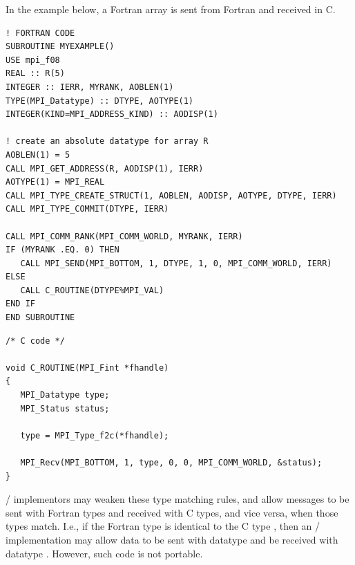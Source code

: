 \begin{example}
%
%
In the example below, a Fortran array is sent from Fortran and received in
C.

\begin{lstlisting}[language={[MPI08]Fortran}]
! FORTRAN CODE
SUBROUTINE MYEXAMPLE()
USE mpi_f08
REAL :: R(5)
INTEGER :: IERR, MYRANK, AOBLEN(1)
TYPE(MPI_Datatype) :: DTYPE, AOTYPE(1)
INTEGER(KIND=MPI_ADDRESS_KIND) :: AODISP(1)

! create an absolute datatype for array R
AOBLEN(1) = 5
CALL MPI_GET_ADDRESS(R, AODISP(1), IERR)
AOTYPE(1) = MPI_REAL
CALL MPI_TYPE_CREATE_STRUCT(1, AOBLEN, AODISP, AOTYPE, DTYPE, IERR)
CALL MPI_TYPE_COMMIT(DTYPE, IERR)

CALL MPI_COMM_RANK(MPI_COMM_WORLD, MYRANK, IERR)
IF (MYRANK .EQ. 0) THEN
   CALL MPI_SEND(MPI_BOTTOM, 1, DTYPE, 1, 0, MPI_COMM_WORLD, IERR)
ELSE
   CALL C_ROUTINE(DTYPE%MPI_VAL)
END IF
END SUBROUTINE
\end{lstlisting}

\begin{lstlisting}[language={[MPI]C}]
/* C code */

void C_ROUTINE(MPI_Fint *fhandle)
{
   MPI_Datatype type;
   MPI_Status status;

   type = MPI_Type_f2c(*fhandle);

   MPI_Recv(MPI_BOTTOM, 1, type, 0, 0, MPI_COMM_WORLD, &status);
}
\end{lstlisting}
\end{example}

\MPI/ implementors may weaken these type matching rules, and allow
messages to be sent with Fortran types and received with C types, and
vice versa, when those types match.  I.e., if the Fortran type
 is identical to the C type
, then an \MPI/ implementation may allow data to be sent
with datatype  and be received with datatype
.  However, such code is not portable.

